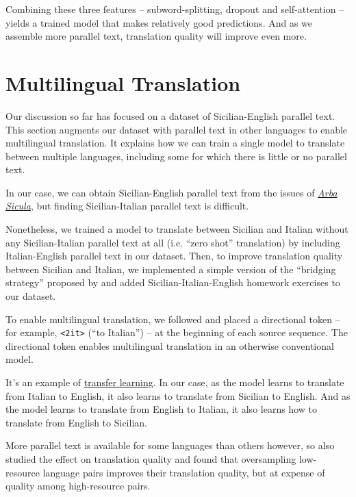 \documentclass[10pt,letterpaper]{article}
\begin{document}
Combining these three features -- subword-splitting, dropout and self-attention --
yields a trained model that makes relatively good predictions.
And as we assemble more parallel text, translation quality will improve even more.
      


\hypertarget{multilingual}{}

\section{Multilingual Translation}

Our discussion so far has focused on a dataset of Sicilian-English parallel text.
This section augments our dataset with parallel text in other languages to enable multilingual translation.
It explains how we can train a single model to translate between multiple languages,
including some for which there is little or no parallel text.

In our case, we can obtain Sicilian-English parallel text from the issues of
\href{https://www.arbasicula.org/}{\textit{Arba Sicula}},
but finding Sicilian-Italian parallel text is difficult.



Nonetheless, we trained a model to translate between Sicilian and Italian
without any Sicilian-Italian parallel text at all (i.e. ``zero shot'' translation)
by including Italian-English parallel text in our dataset.
Then, to improve translation quality between Sicilian and Italian,
we implemented a simple version of the ``bridging strategy'' proposed by
\citet{fan2020beyond} and added Sicilian-Italian-English homework exercises to our dataset.

To enable multilingual translation, we followed \citet{johnson2017zeroshot} and placed a directional
token -- for example, \texttt{<2it>} (``to Italian'') -- at the beginning of each source sequence.
The directional token enables multilingual translation in an otherwise conventional model.

It's an example of \href{https://en.wikipedia.org/wiki/Transfer_learning}{transfer learning}. 
In our case, as the model learns to translate from Italian to English, it also learns to translate 
from Sicilian to English.  And as the model learns to translate from English to Italian, 
it also learns how to translate from English to Sicilian.
      
More parallel text is available for some languages than others however, so 
\citeauthor{johnson2017zeroshot} also studied the effect on translation quality
and found that oversampling low-resource language pairs improves
their translation quality, but at expense of quality among high-resource pairs.
      
\end{document}
